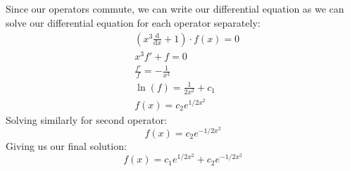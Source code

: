 \documentclass[12pt]{article}
\begin{document}
\subsection{}
Since our operators commute, we can write our differential equation as we can solve our differential equation for each operator separately:
\begin{equation}
    \begin{split}
    &\left(x^3 \frac{\mathrm{d}}{\mathrm{d}x}+1\right)\cdot f(x) = 0\\
    &x^3f' + f = 0\\
    &\frac{f'}{f} = -\frac{1}{x^3}\\
    &\ln(f) = \frac{1}{2x^2} + c_1\\
    &f(x) = c_2e^{1/2x^2} 
    \end{split}
\end{equation}
Solving similarly for second operator:\
\begin{equation}
    f(x) = c_2e^{-1/2x^2} 
\end{equation}
Giving us our final solution:
\begin{equation}
    f(x) = c_1e^{1/2x^2} + c_2e^{-1/2x^2}
\end{equation}
\end{document}
